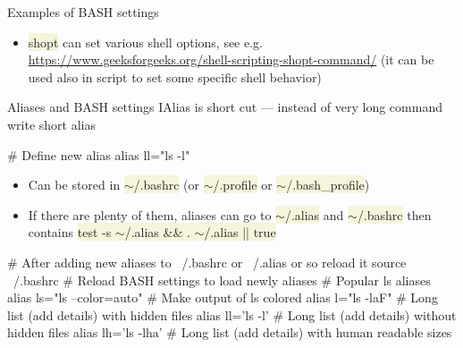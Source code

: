 \documentclass[compress, xelatex, 11pt, xcolor=svgnames, aspectratio=169, url={hyphens, lowtilde}]{beamer}
\renewcommand{\texttt}[1]{\colorbox{Beige}{{\ttfamily #1}}}
\begin{document}
\begin{frame}[fragile]{Examples of BASH settings}
	\begin{itemize}
		\item \texttt{shopt} can set various shell options, see e.g. \url{https://www.geeksforgeeks.org/shell-scripting-shopt-command/} (it can be used also in script to set some specific shell behavior)
	\end{itemize}
\end{frame}

\begin{frame}[fragile]{Aliases and BASH settings I}{Alias is short cut --- instead of very long command write short alias}
	\begin{bashcode}
    # Define new alias
    alias ll="ls -l"
	\end{bashcode}
	\vfill
	\begin{itemize}
		\item Can be stored in \texttt{$\sim$/.bashrc} (or \texttt{$\sim$/.profile} or \texttt{$\sim$/.bash\_profile})
		\item If there are plenty of them, aliases can go to \texttt{$\sim$/.alias} and \texttt{$\sim$/.bashrc} then contains \texttt{test -s $\sim$/.alias \&\& . $\sim$/.alias || true}
	\end{itemize}
	\vfill
	\begin{bashcode}
    # After adding new aliases to ~/.bashrc or ~/.alias or so reload it
    source ~/.bashrc # Reload BASH settings to load newly aliases
    # Popular ls aliases
    alias ls="ls --color=auto" # Make output of ls colored
    alias l="ls -laF" # Long list (add details) with hidden files
    alias ll='ls -l' # Long list (add details) without hidden files
    alias lh='ls -lha' # Long list (add details) with human readable sizes
	\end{bashcode}
\end{frame}
\end{document}
